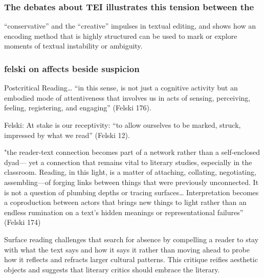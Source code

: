 \documentclass[11pt]{article}
\begin{document}
\subsubsection{The debates about TEI illustrates this tension between the}
\label{sec:org46dd19d}
“conservative” and the “creative” impulses in textual editing, and
shows how an encoding method that is highly structured can be used to
mark or explore moments of textual instability or ambiguity.

\subsubsection{felski on affects beside suspicion}
\label{sec:org12ba222}



Postcritical Reading…  “in this sense, is not just a cognitive
activity but an embodied mode of attentiveness that involves us in
acts of sensing, perceiving, feeling, registering, and engaging”
(Felski 176). 

Felski: At stake is our receptivity: “to allow ourselves to be marked,
struck, impressed by what we read” (Felski 12). 

"the reader-text connection becomes part of a network rather than a
self-enclosed dyad— yet a connection that remains vital to literary
studies, especially in the classroom. Reading, in this light, is a
matter of attaching, collating, negotiating, assembling—of forging
links between things that were previously unconnected. It is not a
question of plumbing depths or tracing surfaces… Interpretation
becomes a coproduction between actors that brings new things to light
rather than an endless rumination on a text’s hidden meanings or
representational failures” (Felski 174)

Surface reading challenges that search for absence by compelling a
reader to stay with what the text says and how it says it rather than
moving ahead to probe how it reflects and refracts larger cultural
patterns. This critique reifies aesthetic objects and suggests that
literary critics should embrace the literary.
\end{document}
